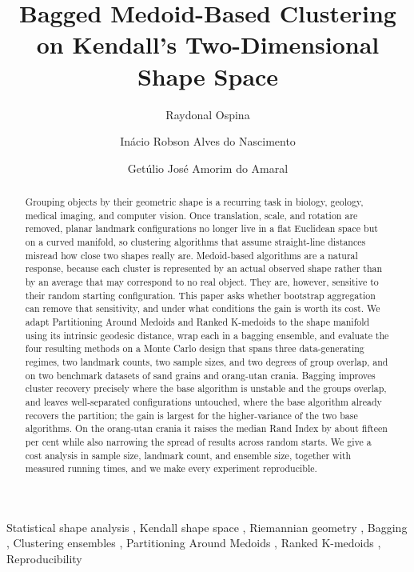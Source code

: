\documentclass[review,11pt,3p,authoryear]{elsarticle}
\begin{document}
\begin{frontmatter}

\title{Bagged Medoid-Based Clustering on Kendall's Two-Dimensional
       Shape Space}

\author[ufba,ufpe]{Raydonal Ospina}
\author[ufpe]{In\'{a}cio Robson Alves do Nascimento}
\author[ufpe]{Get\'{u}lio Jos\'{e} Amorim do Amaral}

\address[ufba]{Departamento de Estat\'{i}stica, LInCa, Universidade Federal
  da Bahia, 40.170--110, Salvador, Bahia, Brazil}
\address[ufpe]{Departamento de Estat\'{i}stica, CASTLab, Universidade Federal
  de Pernambuco, 50.740--540, Recife, Pernambuco, Brazil}

\begin{abstract}
Grouping objects by their geometric shape is a recurring task in biology,
geology, medical imaging, and computer vision. Once translation, scale, and
rotation are removed, planar landmark configurations no longer live in a flat
Euclidean space but on a curved manifold, so clustering algorithms that assume
straight-line distances misread how close two shapes really are. Medoid-based
algorithms are a natural response, because each cluster is represented by an
actual observed shape rather than by an average that may correspond to no real
object. They are, however, sensitive to their random starting configuration.
This paper asks whether bootstrap aggregation can remove that sensitivity, and
under what conditions the gain is worth its cost. We adapt Partitioning Around
Medoids and Ranked K-medoids to the shape manifold using its intrinsic geodesic
distance, wrap each in a bagging ensemble, and evaluate the four resulting
methods on a Monte Carlo design that spans three data-generating regimes, two
landmark counts, two sample sizes, and two degrees of group overlap, and on two
benchmark datasets of sand grains and orang-utan crania. Bagging improves
cluster recovery precisely where the base algorithm is unstable and the groups
overlap, and leaves well-separated configurations untouched, where the base
algorithm already recovers the partition; the gain is largest for the
higher-variance of the two base algorithms. On the orang-utan crania it raises
the median Rand Index by about fifteen per cent while also narrowing the spread
of results across random starts. We give a cost analysis in sample size,
landmark count, and ensemble size, together with measured running times, and we
make every experiment reproducible.
\end{abstract}

\begin{keyword}
Statistical shape analysis \sep
Kendall shape space \sep
Riemannian geometry \sep
Bagging \sep
Clustering ensembles \sep
Partitioning Around Medoids \sep
Ranked K-medoids \sep
Reproducibility
\end{keyword}

\end{frontmatter}
\end{document}
